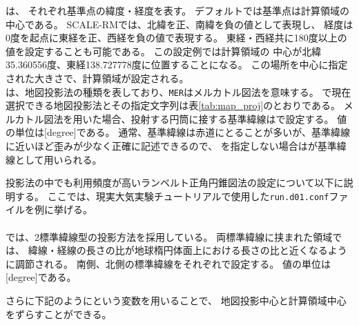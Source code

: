 \noindent
{}は、
それぞれ基準点の緯度・経度を表す。
デフォルトでは基準点は計算領域の中心である。
SCALE-RMでは、北緯を正、南緯を負の値として表現し、
経度は0度を起点に東経を正、西経を負の値で表現する。
東経・西経共に180度以上の値を設定することも可能である。
この設定例では計算領域の
中心が北緯35.360556度、東経138.727778度に位置することになる。
この場所を中心に指定された大きさで、計算領域が設定される。\\
は、地図投影法の種類を表しており、\verb|MER|はメルカトル図法を意味する。
\scalerm で現在選択できる地図投影法とその指定文字列は表\ref{tab:map_proj}のとおりである。
メルカトル図法を用いた場合、投射する円筒に接する基準緯線はで設定する。
値の単位は[degree]である。
通常、基準緯線は赤道にとることが多いが、基準緯線に近いほど歪みが少なく正確に記述できるので、
を指定しない場合はが基準緯線として用いられる。

投影法の中でも利用頻度が高いランベルト正角円錐図法の設定について以下に説明する。
ここでは、現実大気実験チュートリアルで使用した\verb|run.d01.conf|ファイルを例に挙げる。\\

{\small {\gt
{}}}\\

\noindent
\scalerm では、2標準緯線型の投影方法を採用している。
両標準緯線に挟まれた領域では、
緯線・経線の長さの比が地球楕円体面上における長さの比と近くなるように調節される。
南側、北側の標準緯線をそれぞれで設定する。
値の単位は[degree]である。

さらに下記のようにという変数を用いることで、
地図投影中心と計算領域中心をずらすことができる。\\~\\

